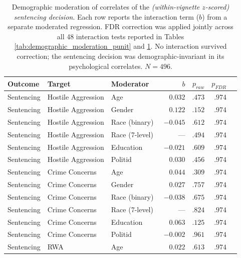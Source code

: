\begin{table}[!htbp]
  \centering
  \caption{Demographic moderation of correlates of the \textit{(within-vignette $z$-scored) sentencing decision}. Each row reports the interaction term ($b$) from a separate moderated regression. FDR correction was applied jointly across all 48 interaction tests reported in Tables \ref{tab:demographic_moderation_punit} and \ref{tab:demographic_moderation_sent}. No interaction survived correction; the sentencing decision was demographic-invariant in its psychological correlates. $N = 496$.}
  \label{tab:demographic_moderation_sent}
  \small
  \begin{tabular}{lllrrrl}
    \toprule
    Outcome & Target & Moderator & $b$ & $p_\textit{raw}$ & $p_\textit{FDR}$ & \\
    \midrule
    Sentencing & Hostile Aggression & Age            & $\phantom{-}0.032$ & $.473$ & $.974$ & \\
    Sentencing & Hostile Aggression & Gender         & $\phantom{-}0.122$ & $.152$ & $.974$ & \\
    Sentencing & Hostile Aggression & Race (binary)  & $-0.045$           & $.612$ & $.974$ & \\
    Sentencing & Hostile Aggression & Race (7-level) & ---                & $.494$ & $.974$ & \\
    Sentencing & Hostile Aggression & Education      & $-0.021$           & $.609$ & $.974$ & \\
    Sentencing & Hostile Aggression & Politid        & $\phantom{-}0.030$ & $.456$ & $.974$ & \\
    \addlinespace
    Sentencing & Crime Concerns     & Age            & $\phantom{-}0.044$ & $.309$ & $.974$ & \\
    Sentencing & Crime Concerns     & Gender         & $\phantom{-}0.027$ & $.757$ & $.974$ & \\
    Sentencing & Crime Concerns     & Race (binary)  & $-0.038$           & $.675$ & $.974$ & \\
    Sentencing & Crime Concerns     & Race (7-level) & ---                & $.824$ & $.974$ & \\
    Sentencing & Crime Concerns     & Education      & $\phantom{-}0.063$ & $.125$ & $.974$ & \\
    Sentencing & Crime Concerns     & Politid        & $-0.002$           & $.961$ & $.974$ & \\
    \addlinespace
    Sentencing & RWA                & Age            & $\phantom{-}0.022$ & $.613$ & $.974$ & \\

\end{tabular}
\end{table}
